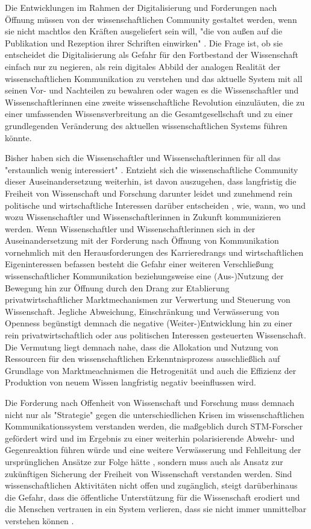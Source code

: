 Die Entwicklungen im Rahmen der Digitalisierung und Forderungen nach Öffnung müssen von der wissenschaftlichen Community gestaltet werden, wenn sie nicht machtlos den Kräften ausgeliefert sein will, "die von außen auf die Publikation und Rezeption ihrer Schriften einwirken" \cite{Hirschi_2015_buch_oa}. Die Frage ist, ob sie entscheidet die Digitalisierung als Gefahr für den Fortbestand der Wissenschaft einfach nur zu negieren, als rein digitales Abbild der analogen Realität der wissenschaftlichen Kommunikation zu verstehen und das aktuelle System mit all seinen Vor- und Nachteilen zu bewahren oder wagen es die Wissenschaftler und Wissenschaftlerinnen eine zweite wissenschaftliche Revolution einzuläuten, die zu einer umfassenden Wissensverbreitung an die Gesamtgesellschaft und zu einer grundlegenden Veränderung des aktuellen wissenschaftlichen Systems führen könnte.

Bisher haben sich die Wissenschaftler und Wissenschaftlerinnen für all das "erstaunlich wenig interessiert" \cite{hagner_2015_sache_buches}. Entzieht sich die wissenschaftliche Community dieser Auseinandersetzung weiterhin, ist davon auszugehen, dass langfristig die Freiheit von Wissenschaft und Forschung darunter leidet und zunehmend rein politische und wirtschaftliche Interessen darüber entscheiden \cite{Warnke_2012}, wie, wann, wo und wozu Wissenschaftler und Wissenschaftlerinnen in Zukunft kommunizieren werden. Wenn Wissenschaftler und Wissenschaftlerinnen sich in der Auseinandersetzung mit der Forderung nach Öffnung von Kommunikation vornehmlich mit den Herausforderungen des Karrieredrangs und wirtschaftlichen Eigeninteressen befassen \cite{resnik_2005_ethics} besteht die Gefahr einer weiteren Verschließung wissenschaftlicher Kommunikation beziehungsweise eine (Aus-)Nutzung der Bewegung hin zur Öffnung durch den Drang zur Etablierung privatwirtschaftlicher Marktmechanismen zur Verwertung und Steuerung von Wissenschaft. Jegliche Abweichung, Einschränkung und Verwässerung von Openness begünstigt demnach die negative (Weiter-)Entwicklung hin zu einer rein privatwirtschaftlich oder aus politischen Interessen gesteuerten Wissenschaft. Die Vermutung liegt demnach nahe, dass die Allokation und Nutzung von Ressourcen für den wissenschaftlichen Erkenntnisprozess ausschließlich auf Grundlage von Marktmeachnismen die Hetrogenität und auch die Effizienz der Produktion von neuem Wissen langfristig negativ beeinflussen wird.

Die Forderung nach Offenheit von Wissenschaft und Forschung muss demnach nicht nur als "Strategie" gegen die unterschiedlichen Krisen im wissenschaftlichen Kommunikationssystem verstanden werden, die maßgeblich durch STM-Forscher gefördert wird und im Ergebnis zu einer weiterhin polarisierende Abwehr- und Gegenreaktion führen würde und eine weitere Verwässerung und Fehlleitung der ursprünglichen Ansätze zur Folge hätte \cite{naeder_2010_open}, sondern muss auch als Ansatz zur zukünftigen Sicherung der Freiheit von Wissenschaft verstanden werden. Sind wissenschaftlichen Aktivitäten nicht offen und zugänglich, steigt darüberhinaus die Gefahr, dass die öffentliche Unterstützung für die Wissenschaft erodiert und die Menschen vertrauen in ein System verlieren, dass sie nicht immer unmittelbar verstehen können \cite{resnik_2005_ethics}.

